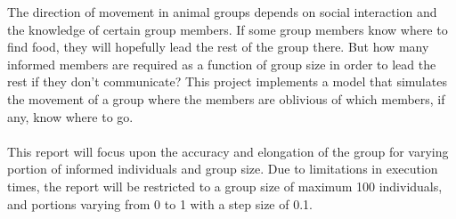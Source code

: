 The direction of movement in animal groups depends on social interaction and the knowledge of certain group members. 
If some group members know where to find food, they will hopefully lead the rest of the group there. 
But how many informed members are required as a function of group size in order to lead the rest if they don't communicate? 
This project implements a model that simulates the movement of a group where the members are oblivious of which members, if any, know where to go.
\\\\
This report will focus upon the accuracy and elongation of the group for varying portion of informed individuals and group size. 
Due to limitations in execution times, the report will be restricted to a group size of maximum 100 individuals, and portions varying from 0 to 1 with a step size of 0.1.